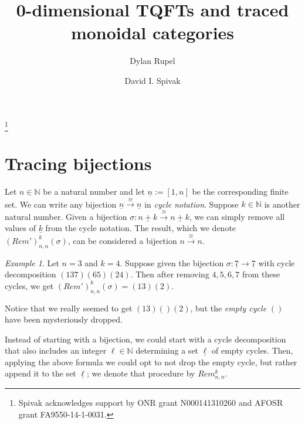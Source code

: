\documentclass{amsart}
\def\NN{{\mathbb N}}
\def\to{\rightarrow}
\def\taking{\colon}
\def\iso{\cong}
\def\ul{\underline}
\newcommand{\To}[1]{\xrightarrow{#1}}
\theoremstyle{remark}
\newtheorem{example}[subsubsection]{Example}
\theoremstyle{definition}
\begin{document}
\title{0-dimensional TQFTs and traced monoidal categories}

\author{Dylan Rupel}
\address{Northeastern University\\360 Huntington Ave.\\Boston, MA 02115}

\author{David I. Spivak}
\address{Massachusetts Institute of Technology\\77 Massachusetts Ave.\\Cambridge, MA 02139}

\thanks{Spivak acknowledges support by ONR grant N000141310260 and AFOSR grant FA9550-14-1-0031.}


\maketitle

\tableofcontents

\section{Tracing bijections}

Let $n\in\NN$ be a natural number and let $\ul{n}:=[1,n]$ be the corresponding finite set. We can write any bijection $\ul{n}\To{\iso}\ul{n}$ in {\em cycle notation}. Suppose $k\in\NN$ is another natural number. Given a bijection $\sigma\taking\ul{n+k}\To{\iso}\ul{n+k}$, we can simply remove all values of $\ul{k}$ from the cycle notation. The result, which we denote $(Rem')^k_{n,n}(\sigma)$, can be considered a bijection $n\To{\iso}n$.

\begin{example}

Let $n=3$ and $k=4$. Suppose given the bijection $\sigma\taking\ul{7}\to\ul{7}$ with cycle decomposition $(1 3 7)(6 5)(2 4)$. Then after removing $4,5,6,7$ from these cycles, we get $(Rem')^k_{n,n}(\sigma)=(1 3)(2)$. 

Notice that we really seemed to get $(1 3)()(2)$, but the {\em empty cycle} $()$ have been mysteriously dropped.

\end{example}

Instead of starting with a bijection, we could start with a cycle decomposition that also includes an integer $\ell\in\NN$ determining a set $\ul\ell$ of empty cycles. Then, applying the above formula we could opt to not drop the empty cycle, but rather append it to the set $\ul\ell$; we denote that procedure by $Rem^k_{n,n}$.
\end{document}
